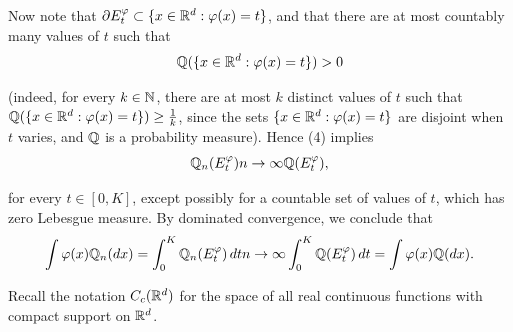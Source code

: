 \documentclass[../Main.tex]{subfiles}
\begin{document}
{Now note that $\partial E_t^\varphi \subset \{x\in\mathbb{R}^d : \varphi(x)=t\}$, and that there are at most countably many values of $t$ such that
\[ \mathbb{Q}(\{x\in\mathbb{R}^d : \varphi(x)=t\}) > 0 \]

(indeed, for every $k\in\mathbb{N}$, there are at most $k$ distinct values of $t$ such that $\mathbb{Q}(\{x\in\mathbb{R}^d : \varphi(x)=t\}) \ge \frac{1}{k}$, since the sets $\{x\in\mathbb{R}^d : \varphi(x)=t\}$ are disjoint when $t$ varies, and $\mathbb{Q}$ is a probability measure). Hence (4) implies
\[ \mathbb{Q}_n(E_t^\varphi) n \to \infty \mathbb{Q}(E_t^\varphi), \]

for every $t\in[0,K]$, except possibly for a countable set of values of $t$, which has zero Lebesgue measure. By dominated convergence, we conclude that
\[ \int \varphi(x)\mathbb{Q}_n(dx) = \int_0^K \mathbb{Q}_n(E_t^\varphi)\,dt n \to \infty \int_0^K \mathbb{Q}(E_t^\varphi)\,dt = \int \varphi(x)\mathbb{Q}(dx). \]
}


Recall the notation $C_c(\mathbb{R}^d)$ for the space of all real continuous functions with compact support on $\mathbb{R}^d$.
\end{document}
